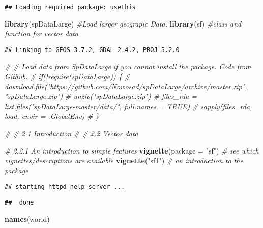 \documentclass[]{article}
\newenvironment{Shaded}{\begin{snugshade}}{\end{snugshade}}
\newcommand{\CommentTok}[1]{\textcolor[rgb]{0.56,0.35,0.01}{\textit{#1}}}
\newcommand{\DataTypeTok}[1]{\textcolor[rgb]{0.13,0.29,0.53}{#1}}
\newcommand{\KeywordTok}[1]{\textcolor[rgb]{0.13,0.29,0.53}{\textbf{#1}}}
\newcommand{\NormalTok}[1]{#1}
\newcommand{\StringTok}[1]{\textcolor[rgb]{0.31,0.60,0.02}{#1}}
\begin{document}
\begin{verbatim}
## Loading required package: usethis
\end{verbatim}

\begin{Shaded}
\begin{Highlighting}[]
\KeywordTok{library}\NormalTok{(spDataLarge) }\CommentTok{#Load larger geograpic Data.}
\KeywordTok{library}\NormalTok{(sf) }\CommentTok{#class and function for vector data}
\end{Highlighting}
\end{Shaded}

\begin{verbatim}
## Linking to GEOS 3.7.2, GDAL 2.4.2, PROJ 5.2.0
\end{verbatim}

\begin{Shaded}
\begin{Highlighting}[]
\CommentTok{# # Load data from SpDataLarge if you cannot install the package. Code from Github.}
\CommentTok{# if(!require(spDataLarge)) \{}
\CommentTok{#   download.file("https://github.com/Nowosad/spDataLarge/archive/master.zip", "spDataLarge.zip")}
\CommentTok{#   unzip("spDataLarge.zip")}
\CommentTok{#   files_rda = list.files("spDataLarge-master/data/", full.names = TRUE)}
\CommentTok{#   sapply(files_rda, load, envir = .GlobalEnv)}
\CommentTok{# \}}

\CommentTok{# # 2.1 Introduction}
\CommentTok{# # 2.2 Vector data}

\CommentTok{# 2.2.1 An introduction to simple features}
\KeywordTok{vignette}\NormalTok{(}\DataTypeTok{package =} \StringTok{"sf"}\NormalTok{) }\CommentTok{# see which vignettes/descriptions are available}
\KeywordTok{vignette}\NormalTok{(}\StringTok{"sf1"}\NormalTok{)          }\CommentTok{# an introduction to the package}
\end{Highlighting}
\end{Shaded}

\begin{verbatim}
## starting httpd help server ...
\end{verbatim}

\begin{verbatim}
##  done
\end{verbatim}

\begin{Shaded}
\begin{Highlighting}[]
\KeywordTok{names}\NormalTok{(world)}
\end{Highlighting}
\end{Shaded}
\end{document}
